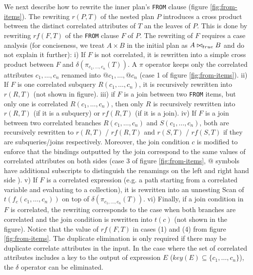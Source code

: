 We next describe how to rewrite the inner plan's \texttt{FROM} clause (figure \ref{fig:from-items}). The rewriting $r(P,T)$ of the nested plan $P$ introduces a cross product between the distinct correlated attributes of $T$ an the leaves of $P$. This is done by rewriting $rf(F,T)$ of the \texttt{FROM} clause $F$ of $P$. The rewriting of $F$ requires a case analysis (for conciseness, we treat $A \times B$ in the initial plan as $A \bowtie_{true} B$ and do not explain it further): i) If $F$ is not correlated, it is rewritten into a simple cross product between $F$ and $\delta(\pi_{c_1, \dots, c_n}(T))$. A $\pi$ operator keeps only the correlated attributes $c_1, \dots, c_n$ renamed into $@c_1, \dots, @c_n$ (case 1 of figure \ref{fig:from-items}). ii) If $F$ is one correlated subquery $R(c_1, \dots, c_n)$, it is recursively rewritten into $r(R,T)$ (not shown in figure). iii) if $F$ is a join between two \texttt{FROM} items, but only one is correlated $R(c_1, \dots, c_n)$, then only $R$ is recursively rewritten into $r(R,T)$ (if it is a subquery) or $rf(R,T)$ (if it is a join).  iv) If $F$ is a join between two correlated branches $R(c_1,\dots,c_n)$ and $S(c_1,\dots,c_n)$, both are recursively rewritten to  $r(R,T)$ / $rf(R,T)$ and $r(S,T)$ / $rf(S,T)$ if they are subqueries/joins respectively. Moreover, the join condition $c$ is modified to enforce that the bindings outputted by the join correspond to the same values of correlated attributes on both sides (case 3 of figure \ref{fig:from-items}, $@$ symbols have additional subscripts to distinguish the renamings on the left and right hand side ).  v) If $F$ is a correlated expression (e.g. a path starting from a correlated variable and evaluating to a collection), it is rewritten into an unnesting Scan of $t(f_c(c_1, \dots, c_n))$ on top of $\delta(\pi_{c_1, \dots, c_n}(T))$. vi) Finally, if a join condition in $F$ is correlated, the rewriting corresponds to the case when both branches are correlated and the join condition is rewritten into $t(c)$ (not shown in the figure). Notice that the value of $rf(F,T)$ in cases (1) and (4) from figure \ref{fig:from-items}. The duplicate elimination is only required if there may be duplicate correlate attributes in the input.  In the case where the set of correlated attributes includes a key to the output of expression $E$ ($key(E) \subseteq \{c_1, \dots, c_n\}$), the $\delta$ operator can be eliminated.

